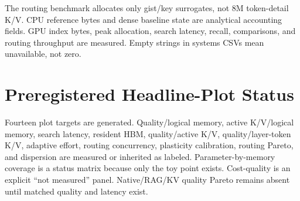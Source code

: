 \documentclass[10pt]{article}
\begin{document}
The routing benchmark allocates only gist/key surrogates, not 8M token-detail K/V.
CPU reference bytes and dense baseline state are analytical accounting fields.
GPU index bytes, peak allocation, search latency, recall, comparisons, and
routing throughput are measured. Empty strings in systems CSVs mean unavailable,
not zero.

\section{Preregistered Headline-Plot Status}

Fourteen plot targets are generated. Quality/logical memory, active K/V/logical
memory, search latency, resident HBM, quality/active K/V, quality/layer-token K/V,
adaptive effort, routing concurrency, plasticity calibration, routing Pareto, and
dispersion are measured or inherited as labeled. Parameter-by-memory coverage is
a status matrix because only the toy point exists. Cost-quality is an explicit
``not measured'' panel. Native/RAG/KV quality Pareto remains absent until matched
quality and latency exist.



\end{document}
